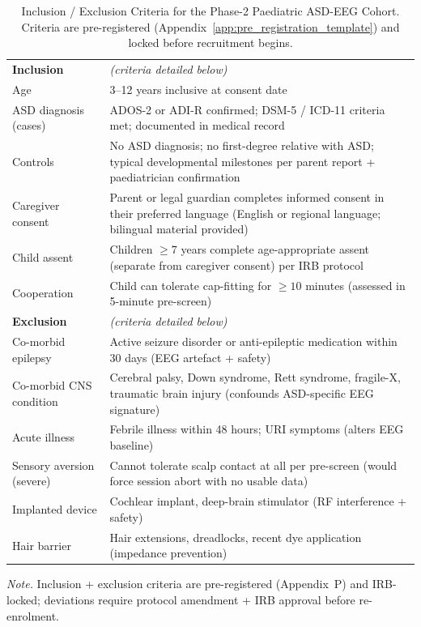 {
\begin{xltabular}{\textwidth}{@{} >{\raggedright\arraybackslash}p{3.4cm} L @{}}
\caption[Inclusion / Exclusion Criteria --- Phase-2 Paediatric ASD Cohort]{Inclusion / Exclusion Criteria for the Phase-2 Paediatric ASD-EEG Cohort. Criteria are pre-registered (Appendix~\ref{app:pre_registration_template}) and locked before recruitment begins.}\label{tab:appg_inclusion_exclusion}\\
\toprule
{} &  \\
\midrule
\endfirsthead
\endhead
\bottomrule
\endlastfoot
\textbf{Inclusion} & \emph{(criteria detailed below)} \\
Age & 3--12 years inclusive at consent date \\
ASD diagnosis (cases) & ADOS-2 or ADI-R confirmed; DSM-5 / ICD-11 criteria met; documented in medical record \\
Controls & No ASD diagnosis; no first-degree relative with ASD; typical developmental milestones per parent report + paediatrician confirmation \\
Caregiver consent & Parent or legal guardian completes informed consent in their preferred language (English or regional language; bilingual material provided) \\
Child assent & Children $\geq 7$ years complete age-appropriate assent (separate from caregiver consent) per IRB protocol \\
Cooperation & Child can tolerate cap-fitting for $\geq 10$ minutes (assessed in 5-minute pre-screen) \\
\textbf{Exclusion} & \emph{(criteria detailed below)} \\
Co-morbid epilepsy & Active seizure disorder or anti-epileptic medication within 30 days (EEG artefact + safety) \\
Co-morbid CNS condition & Cerebral palsy, Down syndrome, Rett syndrome, fragile-X, traumatic brain injury (confounds ASD-specific EEG signature) \\
Acute illness & Febrile illness within 48 hours; URI symptoms (alters EEG baseline) \\
Sensory aversion (severe) & Cannot tolerate scalp contact at all per pre-screen (would force session abort with no usable data) \\
Implanted device & Cochlear implant, deep-brain stimulator (RF interference + safety) \\
Hair barrier & Hair extensions, dreadlocks, recent dye application (impedance prevention) \\
\end{xltabular}}
\vspace{0.3em}\noindent\textit{Note.} Inclusion + exclusion criteria are pre-registered (Appendix~P) and IRB-locked; deviations require protocol amendment + IRB approval before re-enrolment.

